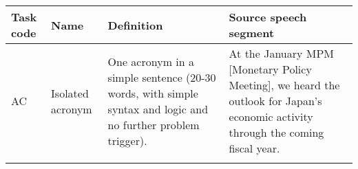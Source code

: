 \begin{sidewaystable}
\small
\begin{tabularx}{\textwidth}{l>{\raggedright\arraybackslash}p{}QQ}
\lsptoprule
{Task code}   & {Name}                                                                                                  & {Definition}                                                                                                                                                                                                                                                                                                                                                                                                                                         & {Source speech segment}                                                                                                                                                                                                                                                                                                                                                                                                                                                                                                                          \\ \midrule

AC                   & Isolated acronym                                                                                               & One acronym in a simple sentence (20-30 words, with simple syntax and logic and no further problem trigger).                                                                                                                                                                                                                                                                                                   & At the January MPM {[}Monetary Policy Meeting{]}, we heard the outlook for Japan's economic activity through the coming fiscal year.                                                                                                                                                                                                                                                                                                                                             \\ \tablevspace


\end{tabularx}
\end{sidewaystable}

